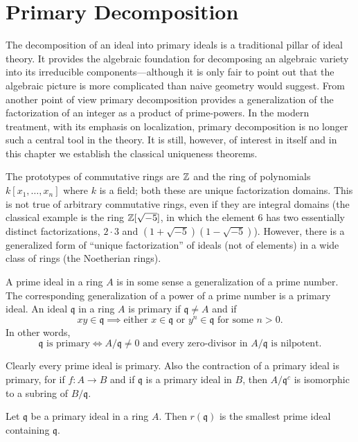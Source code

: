 \chapter{Primary Decomposition}\label{chapter4}

The decomposition of an ideal into primary ideals is a traditional pillar of ideal theory. It provides the algebraic foundation for decomposing an algebraic variety into its irreducible components---although it is only fair to point out that the algebraic picture is more complicated than naive geometry would suggest. From another point of view primary decomposition provides a generalization of the factorization of an integer as a product of prime-powers. In the modern treatment, with its emphasis on localization, primary decomposition is no longer such a central tool in the theory. It is still, however, of interest in itself and in this chapter we establish the classical uniqueness theorems.

The prototypes of commutative rings are $\mathbb{Z}$ and the ring of polynomials $k[x_1, \ldots, x_n]$ where $k$ is a field; both these are unique factorization domains. This is not true of arbitrary commutative rings, even if they are integral domains (the classical example is the ring $\mathbb{Z}[\sqrt{-5}]$, in which the element $6$ has two essentially distinct factorizations, $2 \cdot 3$ and $(1 + \sqrt{-5})(1 - \sqrt{-5})$). However, there is a generalized form of ``unique factorization'' of ideals (not of elements) in a wide class of rings (the Noetherian rings).

A prime ideal in a ring $A$ is in some sense a generalization of a prime number. The corresponding generalization of a power of a prime number is a primary ideal. An ideal $\mathfrak{q}$ in a ring $A$ is primary if $\mathfrak{q} \neq A$ and if
\[
    xy \in \mathfrak{q} \implies \text{either } x \in \mathfrak{q} \text{ or } y^n \in \mathfrak{q} \text{ for some } n > 0.
\]
In other words,
\[
    \mathfrak{q} \text{ is primary} \iff A/\mathfrak{q} \neq 0 \text{ and every zero-divisor in } A/\mathfrak{q} \text{ is nilpotent.}
\]

Clearly every prime ideal is primary. Also the contraction of a primary ideal is primary, for if $f \colon A \to B$ and if $\mathfrak{q}$ is a primary ideal in $B$, then $A/\mathfrak{q}^c$ is isomorphic to a subring of $B/\mathfrak{q}$.

\begin{proposition}\label{prop:radical-primary}
Let $\mathfrak{q}$ be a primary ideal in a ring $A$. Then $r(\mathfrak{q})$ is the smallest prime ideal containing $\mathfrak{q}$.
\end{proposition}

